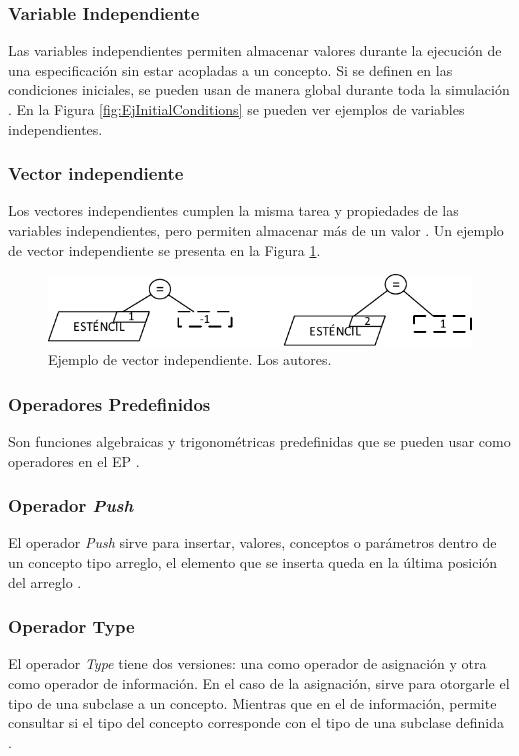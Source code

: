 \subsubsection{Variable Independiente}
Las variables independientes permiten almacenar valores durante la ejecución de una especificación sin estar acopladas a un concepto. Si se definen en las condiciones iniciales, se pueden usan de manera global durante toda la simulación \citep{norena2018det}. En la Figura \ref{fig:EjInitialConditions} se pueden ver ejemplos de variables independientes.\\

\subsubsection{Vector independiente}
Los vectores independientes cumplen la misma tarea y propiedades de las variables independientes, pero permiten almacenar más de un valor \citep{norena2018det}. Un ejemplo de vector independiente se presenta en la Figura \ref{fig:EjVector}.

\begin{figure}[h]
	\centering%
	\includegraphics[width=0.5\linewidth]{Fig/EjVectorIndependiente.pdf}%
	\caption[Ejemplo de vector independiente.]{Ejemplo de vector independiente. Los autores.} \label{fig:EjVector}
\end{figure}

\subsubsection{Operadores Predefinidos}
Son funciones algebraicas y trigonométricas predefinidas que se pueden usar como operadores en el EP \citep{JCalle}.

\subsubsection{Operador \textit{Push}}
El operador \textit{Push} sirve para insertar, valores, conceptos o parámetros dentro de un concepto tipo arreglo, el elemento que se inserta queda en la última posición del arreglo  \citep{JCalle}.
\subsubsection{Operador Type}
El operador \textit{Type} tiene dos versiones: una como operador de asignación y otra como operador de información. En el caso de la asignación, sirve para otorgarle el tipo de una subclase a un concepto. Mientras que en el de información, permite consultar si el tipo del concepto corresponde con el tipo de una subclase definida \citep{JCalle}.
